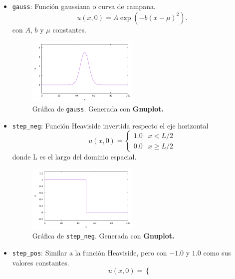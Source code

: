 \documentclass[12pt]{article}
\begin{document}
	\begin{itemize}
		\item \texttt{gauss}: Función gaussiana o curva de campana.
		\begin{equation}
			u(x,0) = A\exp(-b(x-\mu)^{2}).
			\label{eq:gauss-fija}
		\end{equation}
		con $A$, $b$ y $\mu$ constantes.
		\begin{figure}[ht]
			\centering
			\includegraphics[width=0.5\textwidth]{../burgers1DVF/results/graficas_iniciales/gauss.pdf}
			\caption*{Gráfica de \texttt{gauss}. Generada con \textbf{Gnuplot.}}
		\end{figure}
		\item \texttt{step\_neg}: Función Heaviside invertida respecto el eje horizontal
		\begin{equation}
			u(x,0) = 
			\begin{cases}
				1.0 & x < L/2\\
				0.0 & x \geq L/2
			\end{cases}
		\label{eq:step_neg}
		\end{equation}
		donde L es el largo del dominio espacial.
		\begin{figure}[ht]
			\centering
			\includegraphics[width=0.5\textwidth]{../burgers1DVF/results/graficas_iniciales/step_neg.pdf}
			\caption*{Gráfica de \texttt{step\_neg}. Generada con \textbf{Gnuplot.}}
		\end{figure}
		\item \texttt{step\_pos}: Similar a la función Heaviside, pero con $-1.0$ y $1.0$ como sus valores constantes.
		\begin{equation}
			u(x,0) = 
			\begin{cases}

\end{cases}
\end{equation}
\end{itemize}
\end{document}
